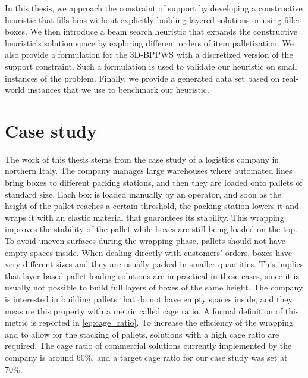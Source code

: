 In this thesis, we approach the constraint of support by developing a constructive heuristic that fills bins without explicitly building layered solutions or using filler boxes.
We then introduce a beam search heuristic that expands the constructive heuristic's solution space by exploring different orders of item palletization.
We also provide a formulation for the 3D-BPPWS with a discretized version of the support constraint. Such a formulation is used to validate our heuristic on small instances of the problem.
Finally, we provide a generated data set based on real-world instances that we use to benchmark our heuristic.

\section{Case study}
\label{sec:intro:case_study}%
The work of this thesis stems from the case study of a logistics company in northern Italy.
The company manages large warehouses where automated lines bring boxes to different packing stations, and then they are loaded onto pallets of standard size.
Each box is loaded manually by an operator, and soon as the height of the pallet reaches a certain threshold, the packing station lowers it and wraps it with an elastic material that guarantees its stability.
This wrapping improves the stability of the pallet while boxes are still being loaded on the top. To avoid uneven surfaces during the wrapping phase, pallets should not have empty spaces inside.
When dealing directly with customers' orders, boxes have very different sizes and they are usually packed in smaller quantities. This implies that layer-based pallet loading solutions are impractical in these cases, since it is usually not possible to build full layers of boxes of the same height.
The company is interested in building pallets that do not have empty spaces inside, and they measure this property with a metric called cage ratio. A formal definition of this metric is reported in \cref{eq:cage_ratio}.
To increase the efficiency of the wrapping and to allow for the stacking of pallets, solutions with a high cage ratio are required.
The cage ratio of commercial solutions currently implemented by the company is around $60\%$, and a target cage ratio for our case study was set at $70\%$.

\newpage
